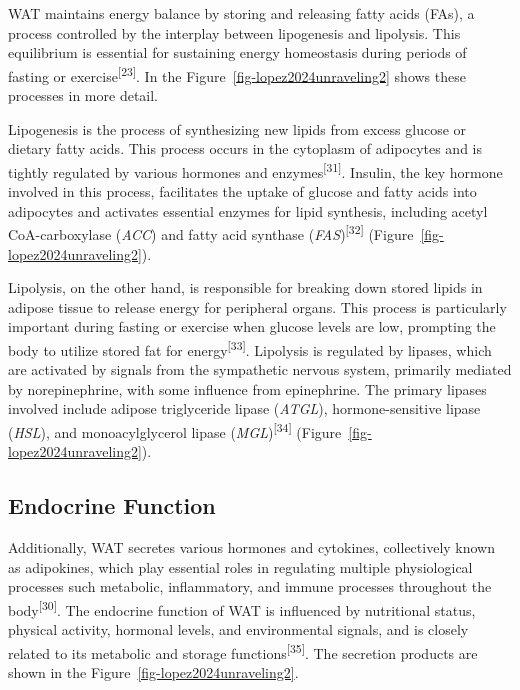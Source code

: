 \documentclass[
  11pt,
  letterpaper,
]{book}
\begin{document}
WAT maintains energy balance by storing and releasing fatty acids (FAs),
a process controlled by the interplay between lipogenesis and lipolysis.
This equilibrium is essential for sustaining energy homeostasis during
periods of fasting or exercise\textsuperscript{{[}23{]}}. In the
Figure~\ref{fig-lopez2024unraveling2} shows these processes in more
detail.

Lipogenesis is the process of synthesizing new lipids from excess
glucose or dietary fatty acids. This process occurs in the cytoplasm of
adipocytes and is tightly regulated by various hormones and
enzymes\textsuperscript{{[}31{]}}. Insulin, the key hormone involved in
this process, facilitates the uptake of glucose and fatty acids into
adipocytes and activates essential enzymes for lipid synthesis,
including acetyl CoA-carboxylase (\emph{ACC}) and fatty acid synthase
(\emph{FAS})\textsuperscript{{[}32{]}}
(Figure~\ref{fig-lopez2024unraveling2}).

Lipolysis, on the other hand, is responsible for breaking down stored
lipids in adipose tissue to release energy for peripheral organs. This
process is particularly important during fasting or exercise when
glucose levels are low, prompting the body to utilize stored fat for
energy\textsuperscript{{[}33{]}}. Lipolysis is regulated by lipases,
which are activated by signals from the sympathetic nervous system,
primarily mediated by norepinephrine, with some influence from
epinephrine. The primary lipases involved include adipose triglyceride
lipase (\emph{ATGL}), hormone-sensitive lipase (\emph{HSL}), and
monoacylglycerol lipase (\emph{MGL})\textsuperscript{{[}34{]}}
(Figure~\ref{fig-lopez2024unraveling2}).

\subsection{Endocrine Function}\label{endocrine-function}

Additionally, WAT secretes various hormones and cytokines, collectively
known as adipokines, which play essential roles in regulating multiple
physiological processes such metabolic, inflammatory, and immune
processes throughout the body\textsuperscript{{[}30{]}}. The endocrine
function of WAT is influenced by nutritional status, physical activity,
hormonal levels, and environmental signals, and is closely related to
its metabolic and storage functions\textsuperscript{{[}35{]}}. The
secretion products are shown in the
Figure~\ref{fig-lopez2024unraveling2}.
\end{document}
